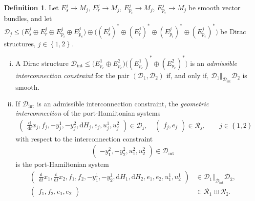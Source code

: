\documentclass[preprint,12pt]{elsarticle}
\theoremstyle{definition}
\newtheorem{definition}[theorem]{Definition}
\newcommand{\set}[1]{\left\lbrace #1\right\rbrace}
\begin{document}
\begin{definition}
Let $E_s^j\to M_j$, $E_r^j\to M_j$, $E_{p_i}^j\to M_j$, $E_{p_e}^j\to M_j$ be smooth vector bundles, and let $\mathcal{D}_j\leq \big(E_s^j\oplus E_r^j\oplus E_{p_i}^j\oplus E_{p_e}^j\big)\oplus\big((E_s^j)^*\oplus (E_r^j)^*\oplus (E_{p_i}^j)^*\oplus (E_{p_e}^j)^*\big)$ be Dirac structures, $j\in\set{1,2}$. 
\begin{enumerate}[(i)]
\item A Dirac structure $\mathcal{D}_{\mathrm{int}}\leq \big(E_{p_e}^1\oplus E_{p_e}^2\big) \big((E_{p_e}^1)^*\oplus (E_{p_e}^2)^*\big)$ is an \textit{admissible interconnection constraint} for the pair $(\mathcal{D}_1,\mathcal{D}_2)$ if, and only if, $\mathcal{D}_1\Vert_{\mathcal{D}_{\mathrm{int}}}\mathcal{D}_2$ is smooth.
\item If $\mathcal{D}_{\mathrm{int}}$ is an admissible interconnection constraint, the \textit{geometric interconnection} of the port-Hamiltonian systems
\begin{align*}
\begin{pmatrix}
\tfrac{\mathrm{d}}{\mathrm{d}t}x_j, f_j, -y_j^1, -y_j^2, \mathrm{d}H_j, e_j, u_j^1, u_j^2
\end{pmatrix} \in\mathcal{D}_j,\quad \begin{pmatrix}
f_j,e_j
\end{pmatrix}\in\mathcal{R}_j, \qquad j\in\set{1,2}
\end{align*}
with respect to the interconnection constraint
\begin{align*}
\begin{pmatrix}
-y_1^2, -y_2^2, u_1^2, u_2^2
\end{pmatrix}\in\mathcal{D}_{\mathrm{int}}
\end{align*}
is the port-Hamiltonian system
\begin{equation*}
\begin{aligned}
\begin{pmatrix}
\tfrac{\mathrm{d}}{\mathrm{d}t}x_1,\tfrac{\mathrm{d}}{\mathrm{d}t}x_2, f_1, f_2, -y_1^1, -y_2^1, \mathrm{d}H_1, \mathrm{d}H_2, e_1, e_2, u_1^1, u_2^1
\end{pmatrix} & \in\mathcal{D}_1\Vert_{\mathcal{D}_{\mathrm{int}}}\mathcal{D}_2,\\
\begin{pmatrix}
f_1,f_2,e_1,e_2
\end{pmatrix} & \in\mathcal{R}_1\boxplus\mathcal{R}_2.
\end{aligned}
\end{equation*}
\end{enumerate}
\end{definition}
\end{document}
